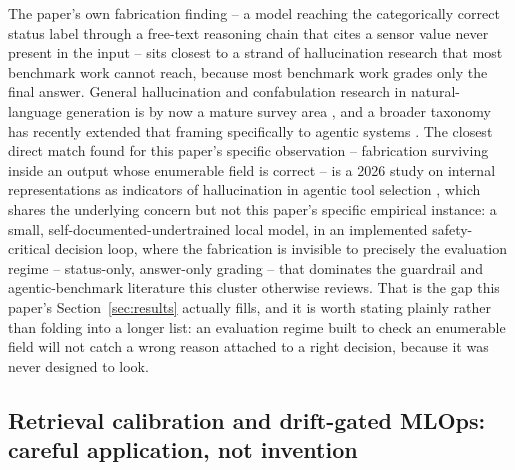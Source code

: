 The paper's own fabrication finding -- a model reaching the categorically correct status label
through a free-text reasoning chain that cites a sensor value never present in the input -- sits
closest to a strand of hallucination research that most benchmark work cannot reach, because most
benchmark work grades only the final answer. General hallucination and confabulation research in
natural-language generation is by now a mature survey area \citep{ji2023hallucinationsurvey}, and
a broader taxonomy has recently extended that framing specifically to agentic systems
\citep{arxiv2509agenthallucinationsurvey}. The closest direct match found for this paper's specific
observation -- fabrication surviving inside an output whose enumerable field is correct -- is a
2026 study on internal representations as indicators of hallucination in agentic tool selection
\citep{arxiv2601toolhallucination}, which shares the underlying concern but not this paper's
specific empirical instance: a small, self-documented-undertrained local model, in an implemented
safety-critical decision loop, where the fabrication is invisible to precisely the evaluation
regime -- status-only, answer-only grading -- that dominates the guardrail and agentic-benchmark
literature this cluster otherwise reviews. That is the gap this paper's Section~\ref{sec:results}
actually fills, and it is worth stating plainly rather than folding into a longer list: an
evaluation regime built to check an enumerable field will not catch a wrong reason attached to a
right decision, because it was never designed to look.

\subsection{Retrieval calibration and drift-gated MLOps: careful application, not invention}

